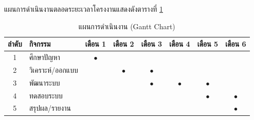แผนการดำเนินงานตลอดระยะเวลาโครงงานแสดงดังตารางที่ \ref{tab:gantt}

\begin{table}[H]
\centering
\caption{แผนการดำเนินงาน (Gantt Chart)}
\label{tab:gantt}
\begin{tabular}{|c|l|c|c|c|c|c|c|}
\hline
\textbf{ลำดับ} & \textbf{กิจกรรม} & \textbf{เดือน 1} & \textbf{เดือน 2} & \textbf{เดือน 3} & \textbf{เดือน 4} & \textbf{เดือน 5} & \textbf{เดือน 6} \\ \hline
1 & ศึกษาปัญหา & $\bullet$ & & & & & \\ \hline
2 & วิเคราะห์/ออกแบบ & & $\bullet$ & $\bullet$ & & & \\ \hline
3 & พัฒนาระบบ & & & $\bullet$ & $\bullet$ & $\bullet$ & \\ \hline
4 & ทดสอบระบบ & & & & & $\bullet$ & $\bullet$ \\ \hline
5 & สรุปผล/รายงาน & & & & & & $\bullet$ \\ \hline
\end{tabular}
\end{table}
